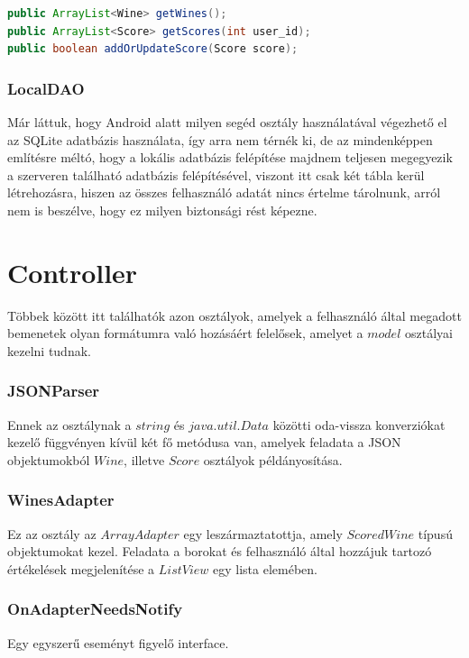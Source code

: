 \documentclass[12pt]{report}
\theoremstyle{definition}
\begin{document}
	\noindent\begin{minipage}{\linewidth}
		\begin{lstlisting}[language=java,label={lst:DAO interface}, caption={DAO interface metódusai}]
public ArrayList<Wine> getWines();    
public ArrayList<Score> getScores(int user_id);    
public boolean addOrUpdateScore(Score score);
		\end{lstlisting}
	\end{minipage}
	
	\subsubsection{LocalDAO}
	Már láttuk, hogy Android alatt milyen segéd osztály használatával végezhető el az SQLite adatbázis használata, így arra nem térnék ki, de az mindenképpen említésre méltó, hogy a lokális adatbázis felépítése majdnem teljesen megegyezik a szerveren található adatbázis felépítésével, viszont itt csak két tábla kerül létrehozásra, hiszen az összes felhasználó adatát nincs értelme tárolnunk, arról nem is beszélve, hogy ez milyen biztonsági rést képezne.
	
	\section{Controller}
	Többek között itt találhatók azon osztályok, amelyek a felhasználó által megadott bemenetek olyan formátumra való hozásáért felelősek, amelyet a $model$ osztályai kezelni tudnak.
	
	\subsubsection{JSONParser}
	Ennek az osztálynak a $string$ és $java.util.Data$ közötti oda-vissza konverziókat kezelő függvényen kívül két fő metódusa van, amelyek feladata a JSON objektumokból $Wine$, illetve $Score$ osztályok példányosítása.
	
	\subsubsection{WinesAdapter}
	Ez az osztály az $ArrayAdapter$ egy leszármaztatottja, amely $ScoredWine$ típusú objektumokat kezel. Feladata a borokat és felhasználó által hozzájuk tartozó értékelések megjelenítése a $ListView$ egy lista elemében.
	
	\subsubsection{OnAdapterNeedsNotify}
	Egy egyszerű eseményt figyelő interface.
	
\end{document}
